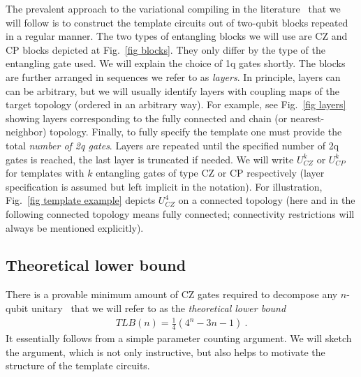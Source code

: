 \documentclass[twocolumn, amsfonts, amssymb, aps, nofootinbib]{revtex4-2}
\newcommand{\CZ}{\textsf{CZ }}
\newcommand{\CP}{\textsf{CP }}
\begin{document}
The prevalent approach to the variational compiling in the literature~\cite{Khatri2019, Madden2021, Rakyta2021, Nakanishi2021, Rakyta2022} that we will follow is to construct the template circuits out of two-qubit blocks repeated in a regular manner. The two types of entangling blocks we will use are \CZ and \CP blocks depicted at Fig.~\ref{fig blocks}. They only differ by the type of the entangling gate used. We will explain the choice of 1q gates shortly. The blocks are further arranged in sequences we refer to as \textit{layers}. In principle, layers can can be arbitrary, but we will usually identify layers with coupling maps of the target topology (ordered in an arbitrary way). For example, see Fig.~\ref{fig layers} showing layers corresponding to the fully connected and chain (or nearest-neighbor) topology. Finally, to fully specify the template one must provide the total \textit{number of 2q gates}. Layers are repeated until the specified number of 2q gates is reached, the last layer is truncated if needed. We will write $U^k_{CZ}$ or $U^k_{CP}$ for templates with $k$ entangling gates of type \CZ or \CP respectively (layer specification is assumed but left implicit in the notation). For illustration, Fig.~\ref{fig template example} depicts $U^4_{CZ}$ on a connected topology (here and in the following connected topology means fully connected; connectivity restrictions will always be mentioned explicitly).


\subsection{Theoretical lower bound \label{sec tlb}}
There is a provable minimum amount of \CZ gates required to decompose any $n$-qubit unitary~\cite{Shende2004} that we will refer to as the \textit{theoretical lower bound}
\begin{align}
TLB(n) = \frac14\left(4^n-3n-1\right) \ . \label{TLB}
\end{align}
It essentially follows from a simple parameter counting argument. We will sketch the argument, which is not only instructive, but also helps to motivate the structure of the template circuits.
\end{document}

